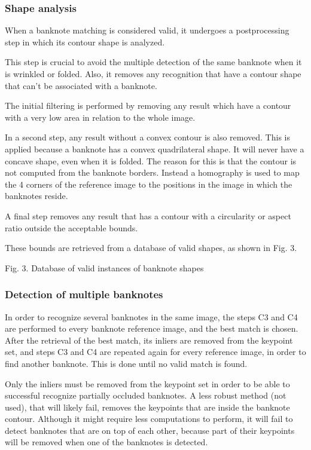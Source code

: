 \subsubsection{Shape analysis}

When a banknote matching is considered valid, it undergoes a postprocessing step in which its contour shape is analyzed.

This step is crucial to avoid the multiple detection of the same banknote when it is wrinkled or folded. Also, it removes any recognition that have a contour shape that can't be associated with a banknote.

The initial filtering is performed by removing any result which have a contour with a very low area in relation to the whole image.

In a second step, any result without a convex contour is also removed. This is applied because a banknote has a convex quadrilateral shape. It will never have a concave shape, even when it is folded. The reason for this is that the contour is not computed from the banknote borders. Instead a homography is used to map the 4 corners of the reference image to the positions in the image in which the banknotes reside.

A final step removes any result that has a contour with a circularity or aspect ratio outside the acceptable bounds. 

These bounds are retrieved from a database of valid shapes, as shown in Fig. 3.

Fig. 3. Database of valid instances of banknote shapes


\subsubsection{Detection of multiple banknotes}

In order to recognize several banknotes in the same image, the steps C3 and C4 are performed to every banknote reference image, and the best match is chosen. After the retrieval of the best match, its inliers are removed from the keypoint set, and steps C3 and C4 are repeated again for every reference image, in order to find another banknote. This is done until no valid match is found.

Only the inliers must be removed from the keypoint set in order to be able to successful recognize partially occluded banknotes. A less robust method (not used), that will likely fail, removes the keypoints that are inside the banknote contour. Although it might require less computations to perform, it will fail to detect banknotes that are on top of each other, because part of their keypoints will be removed when one of the banknotes is detected.
